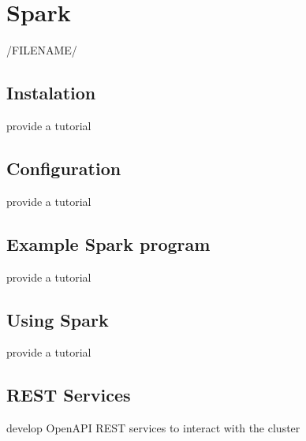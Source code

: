 \chapter{Spark}

/FILENAME/


\section{Instalation}

\begin{exercise}
provide a tutorial 
\end{exercise}

\section{Configuration}

\begin{exercise}
provide a tutorial 
\end{exercise}

\section{Example Spark program}

\begin{exercise}
provide a tutorial 
\end{exercise}

\section{Using Spark}

\begin{exercise}
provide a tutorial 
\end{exercise}

\section{REST Services}

\begin{exercise}
develop OpenAPI REST services to interact with the cluster
\end{exercise}
